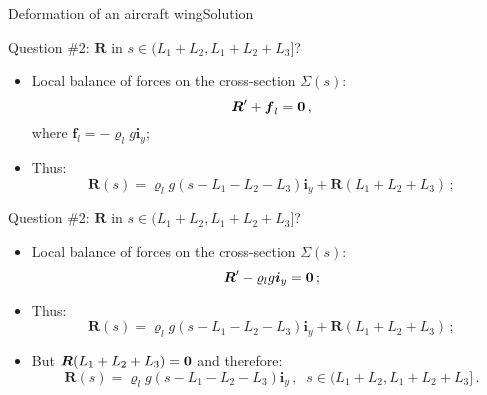 \documentclass{beamer}
\newcommand{\yj}{y}
\renewcommand{\ij}{i}
\newcommand{\iv}{{\boldsymbol\ij}}
\newcommand{\fj}{f}
\newcommand{\fv}{{\boldsymbol\fj}}
\newcommand{\roi}{\varrho}
\newcommand{\Fresj}{R}
\newcommand{\Fres}{{\boldsymbol\Fresj}}
\newcommand{\bzero}{{\bf 0}}
\begin{document}
\begin{frame}{Deformation of an aircraft wing}{Solution}

\begin{overprint}

\vskip-20pt
\begin{exampleblock}{Question \#2: $\Fres$ in $s\in(L_1+L_2,L_1+L_2+L_3]$?}
\begin{itemize}
\item Local balance of forces on the cross-section $\Sigma(s)$:
\begin{displaymath}
\Fres'+\fv_l=\bzero\,,
\end{displaymath}
where $\fv_l=-\roi_l g\iv_\yj$;
\item Thus:
\begin{displaymath}
\Fres(s)=\roi_l g(s-L_1-L_2-L_3)\iv_\yj +\Fres(L_1+L_2+L_3)\,;
\end{displaymath}
\end{itemize}
\end{exampleblock}

\vskip-20pt
\begin{exampleblock}{Question \#2: $\Fres$ in $s\in(L_1+L_2,L_1+L_2+L_3]$?}
\begin{itemize}
\item Local balance of forces on the cross-section $\Sigma(s)$:
\begin{displaymath}
\Fres'-\roi_l g\iv_\yj=\bzero\,;
\end{displaymath}
\item Thus:
\begin{displaymath}
\Fres(s)=\roi_l g(s-L_1-L_2-L_3)\iv_\yj +\Fres(L_1+L_2+L_3)\,;
\end{displaymath}
\item But $\Fres(L_1+L_2+L_3)=\bzero$ and therefore:
\begin{displaymath}
\Fres(s)=\roi_l g(s-L_1-L_2-L_3)\iv_\yj\,,\;\;s\in(L_1+L_2,L_1+L_2+L_3]\,.
\end{displaymath}
\end{itemize}
\end{exampleblock}


\end{overprint}
\end{frame}
\end{document}
